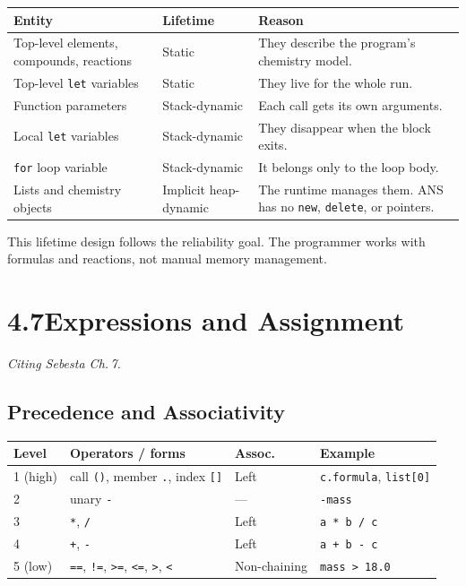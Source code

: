 \documentclass[11pt,a4paper]{article}
\newcommand{\code}[1]{\texttt{#1}}
\begin{document}
{\footnotesize
\begin{tabularx}{\linewidth}{@{}p{4.2cm}p{3.1cm}Y@{}}
\toprule
\textbf{Entity} & \textbf{Lifetime} & \textbf{Reason} \\
\midrule
Top-level elements, compounds, reactions & Static & They describe the program's chemistry model. \\
Top-level \code{let} variables & Static & They live for the whole run. \\
Function parameters & Stack-dynamic & Each call gets its own arguments. \\
Local \code{let} variables & Stack-dynamic & They disappear when the block exits. \\
\code{for} loop variable & Stack-dynamic & It belongs only to the loop body. \\
Lists and chemistry objects & Implicit heap-dynamic & The runtime manages them. ANS has no \code{new}, \code{delete}, or pointers. \\
\bottomrule
\end{tabularx}}

This lifetime design follows the reliability goal. The programmer works with formulas and
reactions, not manual memory management.

\newpage
\section{4.7\quad Expressions and Assignment}
\textit{Citing Sebesta Ch.\,7.}

\subsection{Precedence and Associativity}

\begin{tabularx}{\textwidth}{@{} L{1.4cm} L{4.0cm} L{2.0cm} Y @{}}
\toprule
\textbf{Level} & \textbf{Operators / forms} & \textbf{Assoc.} & \textbf{Example} \\
 (high) & call \code{()}, member \code{.}, index \code{[]} & Left & \code{c.formula}, \code{list[0]} \\
2 & unary \code{-}              & --- & \code{-mass} \\
3 & \code{*}, \code{/}          & Left & \code{a * b / c} \\
4 & \code{+}, \code{-}          & Left & \code{a + b - c} \\
5 (low) & \code{==}, \code{!=}, \code{>=}, \code{<=}, \code{>}, \code{<} & Non-chaining & \code{mass > 18.0} \\
\bottomrule
\end{tabularx}
\end{document}
